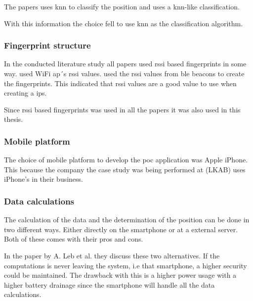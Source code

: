 \bigskip

The papers \cite{BluetoothLowEnergy2018, DevelopmentSmartphoneBasedUniversity2021} uses \acrshort{knn} to classify the position and \cite{PracticalFingerprintingLocalization2017} uses a \acrshort{knn}-like classification.

\bigskip

With this information the choice fell to use \acrshort{knn} as the classification algorithm.

\subsubsection{Fingerprint structure}\label{sec:methodSoftwareDesignFingerprint}
In the conducted literature study all papers used \acrshort{rssi} based fingerprints in some way.
\cite{DevelopmentSmartphoneBasedUniversity2021, IndoorPositioningSystem2010} used WiFi \acrshort{ap}´s \acrshort{rssi} values.
\cite{BluetoothLowEnergy2018, PracticalFingerprintingLocalization2017, ComprehensiveStudyBluetooth2013} used the \acrshort{rssi} values from \acrshort{ble} beacons to create the fingerprints.
This indicated that \acrshort{rssi} values are a good value to use when creating a \acrshort{ips}.
\bigskip

Since \acrshort{rssi} based fingerprints was used in all the papers it was also used in this thesis.


\subsubsection{Mobile platform}\label{sec:methodSoftwareDesignMobilePlatform}
The choice of mobile platform to develop the \acrlong{poc} application was Apple iPhone.
This because the company the case study was being performed at (LKAB) uses iPhone's in their business.

\subsubsection{Data calculations}\label{sec:methodSoftwareDesignData}
The calculation of the data and the determination of the position can be done in two different ways.
Either directly on the smartphone or at a external server. 
Both of these comes with their pros and cons.

\bigskip

In the paper \cite{DevelopmentSmartphoneBasedUniversity2021} by A. Leb et al. they discuss these two alternatives.
If the computations is never leaving the system, i.e that smartphone, a higher security could be maintained. 
The drawback with this is a higher power usage with a higher battery drainage since the smartphone will handle all the data calculations.

